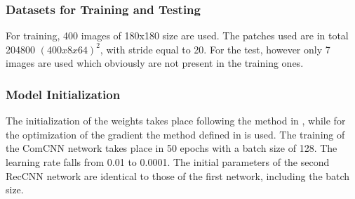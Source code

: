 \subsubsection{Datasets for Training and Testing}
For training, 400 images of 180x180 size are used. The patches used are in 
total 204800 $ (400x8x64)^2 $, with stride equal to 20. For the test, however only 
7 images are used which obviously are not present in the training ones.

\subsubsection{Model Initialization}
The initialization of the weights takes place following the method in \cite{0799924140}, 
while for the optimization of the gradient the method defined in \cite{0799924121} is used.
The training of the ComCNN network takes place in 50 epochs with a batch 
size of 128. The learning rate falls from 0.01 to 0.0001. The initial parameters 
of the second RecCNN network are identical to those of the first network, 
including the batch size.



